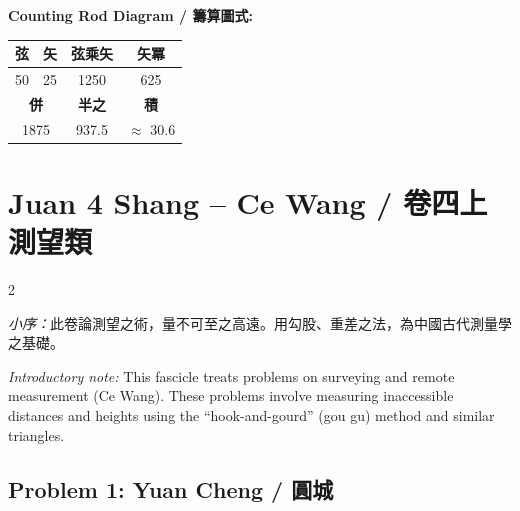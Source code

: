 \documentclass[11pt,a4paper]{article}
\begin{document}
\vspace{0.5em}
\noindent\textbf{Counting Rod Diagram / 籌算圖式:}
\begin{center}
\begin{tabular}{|c|c|c|c|}
\hline
\textbf{弦} & \textbf{矢} & \textbf{弦乘矢} & \textbf{矢冪} \\
\hline
50 & 25 & 1250 & 625 \\
\hline
\multicolumn{2}{|c|}{\textbf{併}} & \textbf{半之} & \textbf{積} \\
\hline
\multicolumn{2}{|c|}{1875} & 937.5 & $\approx$ 30.6 \\
\hline
\end{tabular}
\end{center}

\newpage

\section{Juan 4 Shang -- Ce Wang / 卷四上測望類}
\label{sec:juan4shang}

\begin{paracol}{2}

\begin{leftcolumn*}
\noindent\textit{小序：}此卷論測望之術，量不可至之高遠。用勾股、重差之法，為中國古代測量學之基礎。
\end{leftcolumn*}

\begin{rightcolumn}
\noindent\textit{Introductory note:} This fascicle treats problems on 
surveying and remote measurement (Ce Wang). These problems involve measuring 
inaccessible distances and heights using the ``hook-and-gourd'' (gou gu) 
method and similar triangles.
\end{rightcolumn}

\end{paracol}

\vspace{0.5em}

\subsection*{Problem 1: Yuan Cheng / 圓城}
\end{document}
